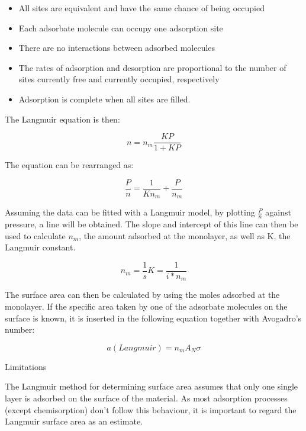 \begin{itemize}
    \item All sites are equivalent and have the same chance of being occupied
    \item Each adsorbate molecule can occupy one adsorption site
    \item There are no interactions between adsorbed molecules
    \item The rates of adsorption and desorption are proportional to the number
            of sites currently free and currently occupied, respectively
    \item Adsorption is complete when all sites are filled.
\end{itemize}

The Langmuir equation is then:

\begin{equation}
    n = n_m\frac{KP}{1+KP}
\end{equation}

The equation can be rearranged as:

\begin{equation}
	\frac{P}{n} = \frac{1}{K n_m} + \frac{P}{n_m}
\end{equation}

Assuming the data can be fitted with a Langmuir model, by plotting
\(\frac{P}{n}\) against pressure, a line will be obtained. The slope and
intercept of this line can then be used to calculate \(n_{m}\),
the amount adsorbed at the monolayer, as well as K, the Langmuir constant.

\begin{equation}
	n_m = \frac{1}{s}
	K = \frac{1}{i * n_m}
\end{equation}


The surface area can then be calculated by using the moles adsorbed at the
monolayer. If the specific area taken by one of the adsorbate molecules on
the surface is known, it is inserted in the following equation together with Avogadro's number:

\begin{equation}
	a(Langmuir) = n_m A_N \sigma
\end{equation}


Limitations

The Langmuir method for determining surface area assumes that only one single
layer is adsorbed on the surface of the material. As most adsorption processes
(except chemisorption) don't follow this behaviour, it is important to regard
the Langmuir surface area as an estimate.

